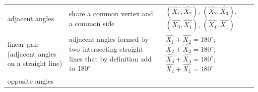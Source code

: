 {{\begin{center}
\begin{xtabular}[t]{|l|l|l|}
        adjacent angles &
        share a common vertex and a common side &
        $\left(\hat{{X}_{1}},\hat{{X}_{2}}\right)$, \begin{math}\left(\hat{{X}_{2}},\hat{{X}_{3}}\right)\end{math}, \begin{math}\left(\hat{{X}_{3}},\hat{{X}_{4}}\right)\end{math}, \begin{math}\left(\hat{{X}_{4}},\hat{{X}_{1}}\right)\end{math}%
     \tabularnewline{}
        linear pair (adjacent angles on a straight line) &
        adjacent angles formed by two intersecting straight lines that by definition add to 180${}^{\circ }$ &
                  $\hat{{X}_{1}}+\hat{{X}_{2}}={180}^{\circ }$;
                  $\hat{{X}_{2}}+\hat{{X}_{3}}={180}^{\circ }$;
                  $\hat{{X}_{3}}+\hat{{X}_{4}}={180}^{\circ }$;
                  $\hat{{X}_{4}}+\hat{{X}_{1}}={180}^{\circ }$
     \tabularnewline{}
        opposite angles &

\end{xtabular}
\end{center}}}
